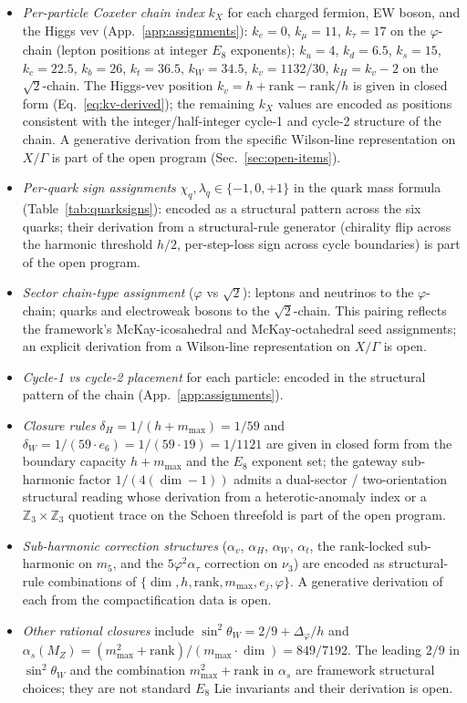 ﻿\documentclass[reprint,amsmath,amssymb,aps,prd,longbibliography,floatfix]{revtex4-2}
\begin{document}
\begin{itemize}
\item \emph{Per-particle Coxeter chain index} $k_X$ for each charged
fermion, EW boson, and the Higgs vev (App.~\ref{app:assignments}):
$k_e=0$, $k_\mu=11$, $k_\tau=17$ on the $\varphi$-chain (lepton
positions at integer $E_8$ exponents); $k_u=4$, $k_d=6.5$, $k_s=15$,
$k_c=22.5$, $k_b=26$, $k_t=36.5$, $k_W=34.5$, $k_v=1132/30$,
$k_H = k_v - 2$ on the $\sqrt{2}$-chain. The Higgs-vev position
$k_v = h + \mathrm{rank} - \mathrm{rank}/h$ is given in closed form
(Eq.~\ref{eq:kv-derived}); the remaining $k_X$ values are encoded
as positions consistent with the integer/half-integer cycle-1 and
cycle-2 structure of the chain. A generative derivation from the
specific Wilson-line representation on $X/\Gamma$ is part of the
open program (Sec.~\ref{sec:open-items}).
\item \emph{Per-quark sign assignments} $\chi_q, \lambda_q \in \{-1,
0, +1\}$ in the quark mass formula (Table~\ref{tab:quarksigns}):
encoded as a structural pattern across the six quarks; their
derivation from a structural-rule generator (chirality flip across
the harmonic threshold $h/2$, per-step-loss sign across cycle
boundaries) is part of the open program.
\item \emph{Sector chain-type assignment} ($\varphi$ vs $\sqrt{2}$):
leptons and neutrinos to the $\varphi$-chain; quarks and electroweak
bosons to the $\sqrt{2}$-chain. This pairing reflects the framework's
McKay-icosahedral and McKay-octahedral seed assignments; an explicit
derivation from a Wilson-line representation on $X/\Gamma$ is open.
\item \emph{Cycle-1 vs cycle-2 placement} for each particle: encoded
in the structural pattern of the chain
(App.~\ref{app:assignments}).
\item \emph{Closure rules} $\delta_H = 1/(h+m_{\max}) = 1/59$ and
$\delta_W = 1/(59 \cdot e_6) = 1/(59 \cdot 19) = 1/1121$ are given
in closed form from the boundary capacity $h+m_{\max}$ and the
$E_8$ exponent set; the gateway sub-harmonic factor $1/(4(\dim-1))$
admits a dual-sector / two-orientation structural reading whose
derivation from a heterotic-anomaly index or a $\mathbb{Z}_3
\times \mathbb{Z}_3$ quotient trace on the Schoen threefold is part
of the open program.
\item \emph{Sub-harmonic correction structures} ($\alpha_v$,
$\alpha_H$, $\alpha_W$, $\alpha_t$, the rank-locked sub-harmonic on
$m_5$, and the $5\varphi^2 \alpha_\tau$ correction on $\nu_3$) are
encoded as structural-rule combinations of $\{\dim, h,
\mathrm{rank}, m_{\max}, e_j, \varphi\}$. A generative derivation
of each from the compactification data is open.
\item \emph{Other rational closures} include $\sin^2 \theta_W = 2/9 +
\Delta_\varphi/h$ and $\alpha_s(M_Z) = (m_{\max}^2 + \mathrm{rank})/
(m_{\max} \cdot \dim) = 849/7192$. The leading $2/9$ in
$\sin^2\theta_W$ and the combination $m_{\max}^2 + \mathrm{rank}$ in
$\alpha_s$ are framework structural choices; they are not standard
$E_8$ Lie invariants and their derivation is open.
\end{itemize}
\end{document}

